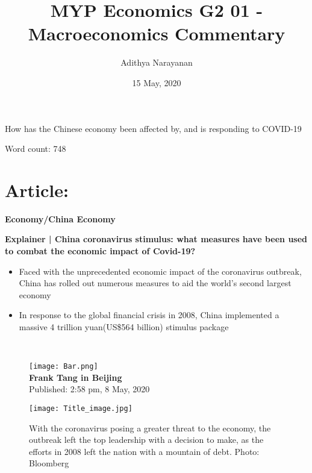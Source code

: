 \documentclass[11pt, a4paper]{article}
\title{MYP Economics G2 01 - Macroeconomics Commentary}
\author{Adithya Narayanan}
\date{15 May, 2020}
\newcommand{\roundpic}[4][]{
  \tikz\node [circle, minimum width = #2,
    path picture = {
      \node [#1] at(path picture bounding box.center) {
        \texttt{[image: \#4]}};
    }] {};}
\def\x{\roundpic[xshift=0cm,yshift=0cm]{1.75cm}{1.75cm}{Frank_Tang.png}}
\def\y{\parbox[t]{2.5in}{\texttt{[image: Bar.png]} \\ \textbf{Frank Tang in Beijing}\\ {Published: 2:58 pm, 8 May, 2020}}}
\begin{document}
	\begin{titlepage}
		\maketitle

		\begin{center}
			\large How has the Chinese economy been affected by, and is responding to COVID-19

			Word count: 748
		\end{center}
		\thispagestyle{empty}
	\end{titlepage}
	
	\newpage
	\tableofcontents
	\thispagestyle{empty}
	\newpage
	\clearpage
	\setcounter{page}{1}
	\setcounter{secnumdepth}{0}
    \section{Article:}
        \textbf{Economy/China Economy}

        \bigbreak
		\noindent
        \textbf{\LARGE Explainer | China coronavirus stimulus: what measures have been used to combat the economic impact of Covid-19?}
        
        \begin{itemize}
            \item Faced with the unprecedented economic impact of the coronavirus outbreak, China has rolled out numerous measures to aid the world’s second largest economy

            \item In response to the global financial crisis in 2008, China implemented a massive 4 trillion yuan(US\$564 billion) stimulus package
        \end{itemize}
        
        \vspace{-6mm}

        \begin{figure}[H]
            \ \ \raisebox{\baselineskip -\heightof{\x}}{\x} 
            ~\y
        \end{figure}

        \vspace{-8mm}
        
        \begin{figure}[H]
            \texttt{[image: Title\_image.jpg]}
            \caption*{With the coronavirus posing a greater threat to the economy, the outbreak left the top leadership with a decision to make, as the efforts in 2008 left the nation with a mountain of debt. Photo: Bloomberg}
        \end{figure}
\end{document}
